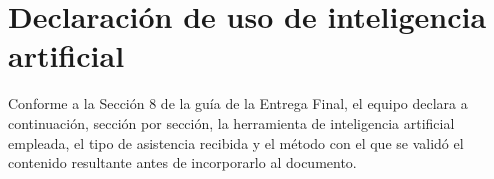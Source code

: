 
\section{Declaración de uso de inteligencia artificial}
\label{anexo:declaracion-ia}

Conforme a la Sección 8 de la guía de la Entrega Final, el equipo declara a
continuación, sección por sección, la herramienta de inteligencia artificial
empleada, el tipo de asistencia recibida y el método con el que se validó el
contenido resultante antes de incorporarlo al documento.

